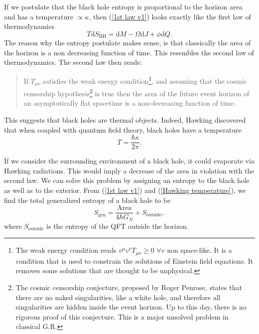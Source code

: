 If we postulate that the black hole entropy is proportional to the horizon area and has a temperature $\propto \kappa$, then (\ref{1st law v1}) looks exactly like the first law of thermodynamics
\begin{equation}\label{1st law v2}
    T\text{d}S_{\text{BH}} = \text{d}M -\Omega\text{d}J + \phi\text{d}Q.
\end{equation}
The reason why the entropy postulate makes sense, is that classically the area of the horizon is a non decreasing function of time. This resembles the second law of thermodynamics. The second law then reads\cite{Townsend:1997ku}: \begin{quote}
    If $T_{\mu\nu}$ satisfies the weak energy condition\footnote{The weak energy condition reads $v^\mu v^\nu T_{\mu\nu}\geq 0$ $\forall v$ non space-like. It is a condition that is used to constrain the solutions of Einstein field equations. It removes some solutions that are thought to be unphysical.}, and assuming that the cosmic censorship hypothesis\footnote{The cosmic censorship conjecture, proposed by Roger Penrose, states that there are no naked singularities, like a white hole, and therefore all singularities are hidden inside the event horizon. Up to this day, there is no rigorous proof of this conjecture. This is a major unsolved problem in classical G.R.} is true then the area of the future event horizon of an asymptotically flat spacetime is a non-decreasing function of time.
\end{quote}

This suggests that black holes are thermal objects. Indeed, Hawking discovered \cite{Hawking1975} that when coupled with quantum field theory, black holes have a temperature
\begin{equation}\label{Hawking temperature}
    T = \frac{\hbar \kappa}{2\pi}.
\end{equation}

If we consider the surrounding environment of a black hole, it could evaporate via Hawking radiations. This would imply a decrease of the area in violation with the second law. We can solve this problem by assigning an entropy to the black hole as well as to the exterior. From (\ref{1st law v1}) and (\ref{Hawking temperature}), we find the total generalized entropy of a black hole to be
\begin{equation}\label{generalized entropy}
    S_{\text{gen}} = \frac{\text{Area}}{4\hbar G_N} + S_\text{outside},
\end{equation}
where $S_\text{outside}$ is the entropy of the QFT outside the horizon.

